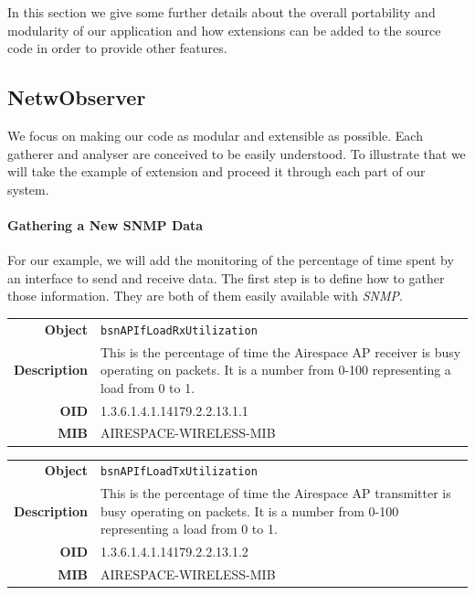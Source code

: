 In this section we give some further details about the overall portability and modularity of our application and how extensions can be added to the source code in order to provide other features.

\subsection{NetwObserver}
We focus on making our code as modular and extensible as possible. Each gatherer and analyser are conceived to be easily understood. To illustrate that we will take the example of extension and proceed it through each part of our system.

\paragraph*{Gathering a New SNMP Data} For our example, we will add the monitoring of the percentage of time spent by an interface to send and receive data. The first step is to define how to gather those information. They are both of them easily available with \emph{SNMP}.

\begin{tabular}{|r l|}
\hline
\textbf{Object} & \texttt{bsnAPIfLoadRxUtilization} \\
\textbf{Description} & \parbox{11cm}{This is the percentage of time the Airespace AP receiver is busy operating on packets. It is a number from 0-100 representing a load from 0 to 1.} \\
\textbf{OID} & 1.3.6.1.4.1.14179.2.2.13.1.1 \\
\textbf{MIB} & AIRESPACE-WIRELESS-MIB \\
\hline
\end{tabular}

\begin{tabular}{|r l|}
\hline
\textbf{Object} & \texttt{bsnAPIfLoadTxUtilization} \\
\textbf{Description} & \parbox{11cm}{This is the percentage of time the Airespace AP transmitter is busy operating on packets. It is a number from 0-100 representing a load from 0 to 1.} \\
\textbf{OID} & 1.3.6.1.4.1.14179.2.2.13.1.2 \\
\textbf{MIB} & AIRESPACE-WIRELESS-MIB \\
\hline
\end{tabular}

